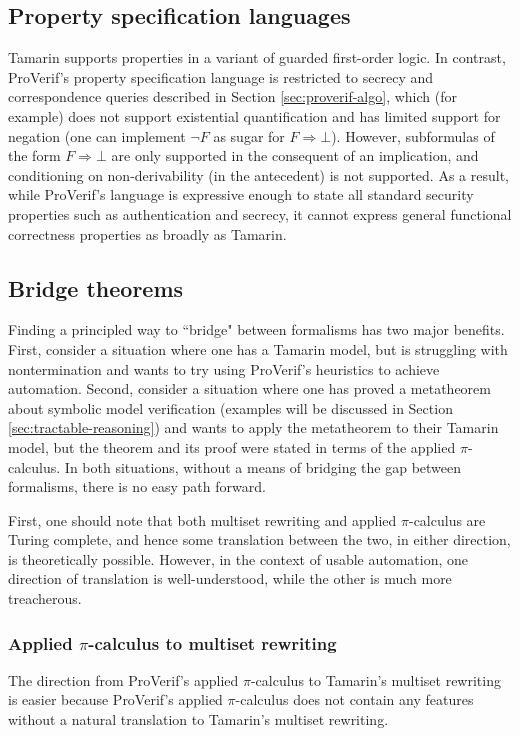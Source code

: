 \documentclass{article}
\theoremstyle{definition}
\begin{document}
\subsection{Property specification languages} 
Tamarin supports properties in a variant of guarded first-order logic. 
In contrast, ProVerif's property specification language is restricted to secrecy and correspondence queries described in 
Section \ref{sec:proverif-algo}, which (for example) does not support existential quantification 
and has limited support for negation (one can implement $\neg F$ as sugar for $F \Rightarrow \bot$).
However, subformulas of the form $F \Rightarrow \bot$ are only supported in the consequent of an implication,
and conditioning on non-derivability (in the antecedent) is not supported.
As a result, while ProVerif's language is expressive enough to state all standard security properties 
such as authentication and secrecy,
it cannot express general functional correctness properties as broadly as Tamarin.

\subsection{Bridge theorems}

Finding a principled way to ``bridge" between formalisms has two major benefits. 
First, consider a situation where one has a Tamarin model, but is struggling with nontermination and wants to try using ProVerif's heuristics to achieve automation. 
Second, consider a situation where one has proved a metatheorem about symbolic model verification (examples will be discussed in Section \ref{sec:tractable-reasoning}) and wants to apply the metatheorem to their Tamarin model, but the theorem and its proof were stated in terms of the applied $\pi$-calculus. 
In both situations, without a means of bridging the gap between formalisms, there is no easy path forward. 

First, one should note that both multiset rewriting and applied $\pi$-calculus are Turing complete, and hence some translation between the two, in either direction, is theoretically possible.
However, in the context of usable automation, one direction of translation is well-understood, while the other is much more treacherous.

\subsubsection{Applied $\pi$-calculus to multiset rewriting} 
The direction from ProVerif's applied $\pi$-calculus to Tamarin's multiset rewriting is easier because ProVerif's applied $\pi$-calculus does not contain any features without a natural translation to Tamarin's multiset rewriting. 
\end{document}

